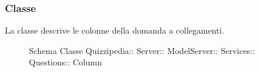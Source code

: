 \subsubsection{Classe }
La classe descrive le colonne della domanda a collegamenti.
\begin{figure}[H]
\centering
\noindent{}
\caption[Schema Classe Column]{Schema Classe Quizzipedia:: Server:: ModelServer:: Services:: Questions:: Column}
\end{figure}
